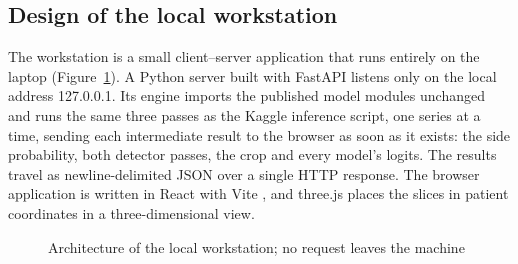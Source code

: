 \subsection{Design of the local workstation}
\label{sec:design-demo}

The workstation is a small client--server application that runs entirely on the laptop (Figure~\ref{fig:demo-arch}). A Python server built with FastAPI \cite{fastapi} listens only on the local address 127.0.0.1. Its engine imports the published model modules unchanged and runs the same three passes as the Kaggle inference script, one series at a time, sending each intermediate result to the browser as soon as it exists: the side probability, both detector passes, the crop and every model's logits. The results travel as newline-delimited JSON over a single HTTP response. The browser application is written in React \cite{react} with Vite \cite{vite}, and three.js \cite{threejs} places the slices in patient coordinates in a three-dimensional view.

\begin{figure}[htbp]
\centering{}
\caption[Architecture of the local workstation]{Architecture of the local workstation; no request leaves the machine}
\label{fig:demo-arch}
\end{figure}

